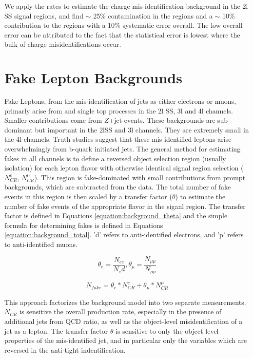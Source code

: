 We apply the rates to estimate the charge mis-identification background in the 2l SS signal regions, and find  $\sim$ 25\% contamination in the \ee regions and a $\sim$ 10\% contribution to the \emu regions with a 10\% systematic error overall. The low overall error can be attributed to the fact that the statistical error is lowest where the bulk of charge misidentifications occur.  


\section{Fake Lepton Backgrounds}
\label{section:fakes}
Fake Leptons, from the mis-identification of jets as either electrons or muons, primarly arise from \ttbar and single top processes in the 2l SS, 3l and 4l channels. Smaller contributions come from $Z$+jet events. These backgrounds are sub-dominant but important in the 2lSS and 3l channels. They are extremely small in the 4l channels. Truth studies suggest that these mis-identified leptons arise overwhelmingly from b-quark initiated jets. The general method for estimating fakes in all channels is to define a reversed object selection region (usually isolation) for each lepton flavor with otherwise identical signal region selection ($N^e_{CR}$, $N^{\mu}_{CR}$). This region is fake-dominated with small contributions from prompt backgrounds, which are subtracted from the data. The total number of fake events in this region is then scaled by a transfer factor ($\theta$) to estimate the number of fake events of the appropriate flavor in the siganl region. The transfer factor is defined in Equations \ref{equation:background_theta} and the simple formula for determining fakes is defined in Equations \ref{equation:background_total}.  'd' refers to anti-identified electrons, and 'p' refers to anti-identified muons.  


\begin{equation}
\theta_e = \frac{N_{ee}}{N_ed}, \theta_{\mu} = \frac{N_{\mu\mu}}{N_{\mu p}}
\label{equation:background_theta}
\end{equation}

\begin{equation}
N_{fake} = \theta_e * N^e_{CR} + \theta_{\mu} * N^{\mu}_{CR}   
\label{equation:background_total}
\end{equation}


This approach factorizes the background model into two separate measurements. $N_{CR}$ is sensitive the overall \ttbar production rate, especially in the presence of additional jets from QCD ratio, as well as the object-level misidentification of a jet as a lepton. The transfer factor $\theta$ is sensitive to only the object level properties of the mis-identified jet, and in particular only the variables which are reversed in the anti-tight indentification. 

